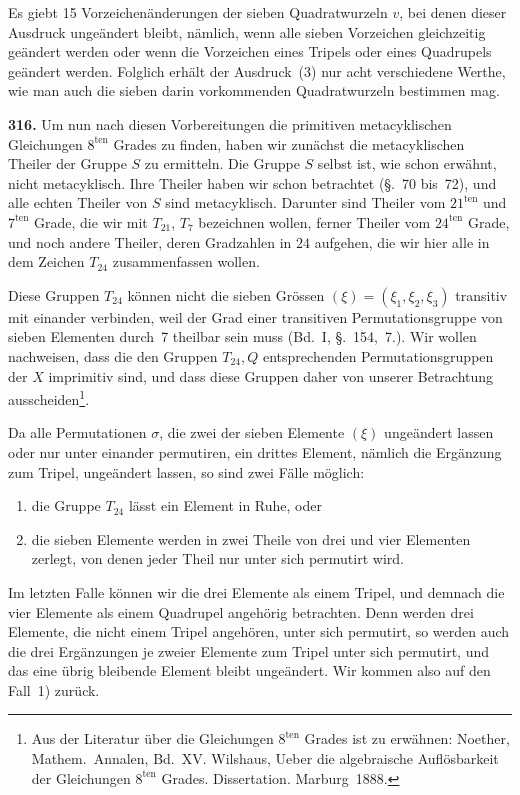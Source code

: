 \documentclass[12pt,a4paper]{article}
\begin{document}
Es giebt 15 Vorzeichen\"anderungen der sieben Quadratwurzeln $v$, bei denen dieser Ausdruck unge\"andert bleibt, n\"amlich, wenn alle sieben Vorzeichen gleichzeitig ge\"andert werden oder wenn die Vorzeichen eines Tripels oder eines Quadrupels ge\"andert werden. Folglich erh\"alt der Ausdruck~(3) nur acht verschiedene Werthe, wie man auch die sieben darin vorkommenden Quadratwurzeln bestimmen mag.

\bigskip
\noindent\textbf{316.} Um nun nach diesen Vorbereitungen die primitiven metacyklischen Gleichungen $8^{\text{ten}}$ Grades zu finden, haben wir zun\"achst die metacyklischen Theiler der Gruppe $S$ zu ermitteln. Die Gruppe $S$ selbst ist, wie schon erw\"ahnt, nicht metacyklisch. Ihre Theiler haben wir schon betrachtet (\S.~70 bis~72), und alle echten Theiler von $S$ sind metacyklisch. Darunter sind Theiler vom $21^{\text{ten}}$ und $7^{\text{ten}}$ Grade, die wir mit $T_{21}$, $T_7$ bezeichnen wollen, ferner Theiler vom $24^{\text{ten}}$ Grade, und noch andere Theiler, deren Gradzahlen in $24$ aufgehen, die wir hier alle in dem Zeichen $T_{24}$ zusammenfassen wollen.

Diese Gruppen $T_{24}$ k\"onnen nicht die sieben Gr\"ossen $(\xi)=(\xi_1,\xi_2,\xi_3)$ transitiv mit einander verbinden, weil der Grad einer transitiven Permutationsgruppe von sieben Elementen durch~7 theilbar sein muss (Bd.~I, \S.~154,~7.). Wir wollen nachweisen, dass die den Gruppen $T_{24},Q$ entsprechenden Permutationsgruppen der $X$ imprimitiv sind, und dass diese Gruppen daher von unserer Betrachtung ausscheiden\footnote{Aus der Literatur \"uber die Gleichungen $8^{\text{ten}}$ Grades ist zu erw\"ahnen: Noether, Mathem.\ Annalen, Bd.~XV. Wilshaus, Ueber die algebraische Aufl\"osbarkeit der Gleichungen $8^{\text{ten}}$ Grades. Dissertation. Marburg~1888.}.

Da alle Permutationen $\sigma$, die zwei der sieben Elemente $(\xi)$ unge\"andert lassen oder nur unter einander permutiren, ein drittes Element, n\"amlich die Erg\"anzung zum Tripel, unge\"andert lassen, so sind zwei F\"alle m\"oglich:
\begin{enumerate}
\item[1)] die Gruppe $T_{24}$ l\"asst ein Element in Ruhe, oder
\item[2)] die sieben Elemente werden in zwei Theile von drei und vier Elementen zerlegt, von denen jeder Theil nur unter sich permutirt wird.
\end{enumerate}

Im letzten Falle k\"onnen wir die drei Elemente als einem Tripel, und demnach die vier Elemente als einem Quadrupel angeh\"orig betrachten. Denn werden drei Elemente, die nicht einem Tripel angeh\"oren, unter sich permutirt, so werden auch die drei Erg\"anzungen je zweier Elemente zum Tripel unter sich permutirt, und das eine \"ubrig bleibende Element bleibt unge\"andert. Wir kommen also auf den Fall~1) zur\"uck.
\end{document}
